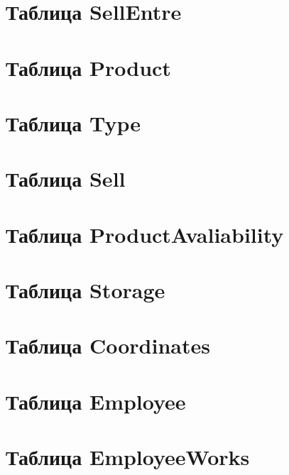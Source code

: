 \documentclass[14pt,a4paper,report]{report}
\begin{document}
\part{Таблица SellEntre}
\part{Таблица Product}
\part{Таблица Type}
\part{Таблица Sell}
\part{Таблица ProductAvaliability}
\part{Таблица Storage}
\part{Таблица Coordinates}
\part{Таблица Employee}
\part{Таблица EmployeeWorks}
\end{document}
